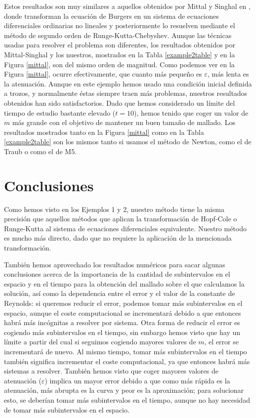 Estos resultados son muy similares a aquellos obtenidos por Mittal y Singhal en \cite{MS}, donde transforman la ecuación de Burgers en un sistema de ecuaciones diferenciales ordinarias no lineales y posteriormente lo resuelven mediante el método de segundo orden de Runge-Kutta-Chebyshev. Aunque las técnicas usadas para resolver el problema son diferentes, los resultados obtenidos por Mittal-Singhal y los nuestros, mostrados en la Tabla \ref{example2table} y en la Figura \ref{mittal}, son del mismo orden de magnitud. Como podemos ver en la Figura \ref{mittal}, ocurre efectivamente, que cuanto más pequeño es $\varepsilon$, más lenta es la atenuación. Aunque en este ejemplo hemos usado una condición inicial definida a trozos, y normalmente éstas siempre traen más problemas, nuestros resultados obtenidos han sido satisfactorios. Dado que hemos considerado un límite del tiempo de estudio bastante elevado ($t=10$), hemos tenido que coger un valor de $m$ más grande con el objetivo de mantener un buen tamaño de mallado. Los resultados mostrados tanto en la Figura \ref{mittal} como en la Tabla \ref{example2table} son los mismos tanto si usamos el método de Newton, como el de Traub o como el de M5.

\section{Conclusiones}

Como hemos visto en los Ejemplos 1 y 2, nuestro método tiene la misma precisión que aquellos métodos que aplican la transformación de Hopf-Cole o Runge-Kutta al sistema de ecuaciones diferenciales equivalente. Nuestro método es mucho más directo, dado que no requiere la aplicación de la mencionada transformación.

También hemos aprovechado los resultados numéricos para sacar algunas conclusiones acerca de la importancia de la cantidad de subintervalos en el espacio y en el tiempo para la obtención del mallado sobre el que calculamos la solución, así como la dependencia entre el error y el valor de la constante de Reynolds: si queremos reducir el error, podemos tomar más subintervalos en el espacio, aunque el coste computacional se incrementará debido a que entonces habrá más incógnitas a resolver por sistema. Otra forma de reducir el error es cogiendo más subintervalos en el tiempo, sin embargo hemos visto que hay un límite a partir del cual si seguimos cogiendo mayores valores de $m$, el error se incrementará de nuevo. Al mismo tiempo, tomar más subintervalos en el tiempo también significa incrementar el coste computacional, ya que entonces habrá más sistemas a resolver. También hemos visto que coger mayores valores de atenuación ($\varepsilon$) implica un mayor error debido a que como más rápida es la atenuación, más abrupta es la curva y peor es la aproximación; para solucionar esto, se deberían tomar más subintervalos en el tiempo, aunque no hay necesidad de tomar más subintervalos en el espacio.